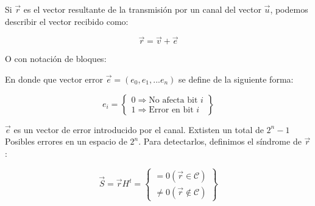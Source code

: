 \documentclass{article}
\begin{document}
Si $\vec{r}$ es el vector resultante de la transmisión por un canal del vector $\vec{u}$, podemos describir el vector recibido como:

\begin{equation}
    \vec{r} = \vec{v} + \vec{e}
\end{equation}

O con notación de bloques:

\begin{center}
\end{center}

En donde que vector error $\vec{e} = (e_0, e_1, ... e_n)$ se define de la siguiente forma:

\begin{equation}
    e_i = 
    \left\{
        \begin{array}{c}
           0 \Rightarrow \text{No afecta bit } i \\
           1 \Rightarrow \text{Error en bit } i 
        \end{array}
    \right\}
\end{equation}


\pagebreak

$\vec{e}$ es un vector de error introducido por el canal. Extisten un total de $2^n-1$ Posibles errores en un espacio de $2^n$. Para detectarlos, definimos el síndrome de $\vec{r}$:

\begin{equation}
    \vec{S} = \vec{r} H^t = 
    \left\{
        \begin{array}{c}
           = 0 (\vec{r} \in \mathcal{C}) \\
           \neq 0 (\vec{r} \notin \mathcal{C}) 
        \end{array}
    \right\}
\end{equation}
\end{document}
